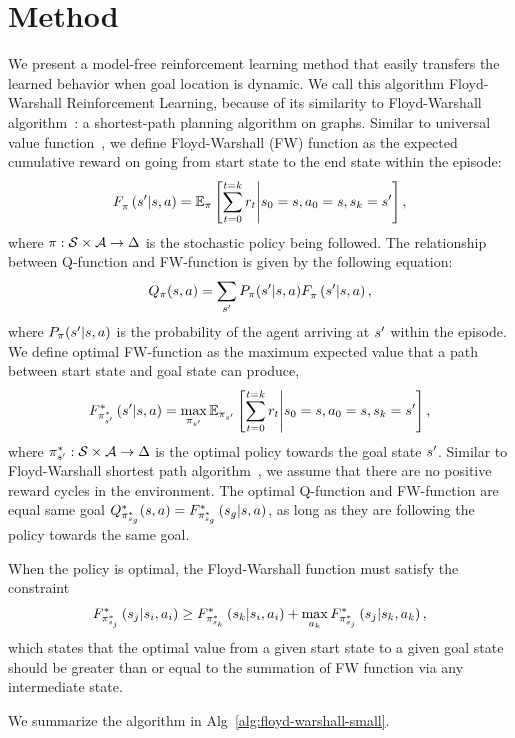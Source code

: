 \section{Method}
We present a model-free reinforcement learning method that easily transfers the
learned behavior when goal location is dynamic. We call this algorithm
Floyd-Warshall Reinforcement Learning, because of its similarity to
Floyd-Warshall algorithm~\cite{floydwarshall1962}:
a shortest-path planning algorithm on graphs. Similar
to universal value function~\cite{schaul2015universal}, we define Floyd-Warshall
(FW) function as the expected cumulative reward on going from start state to the
end state within the episode:
%
\begin{align}
\fwargs{\state}{\act}{\state'}{\policy}{} =
\E_{\policy}\left[ \sum_{t=0}^{t=k} \rew_t \middle\vert \state_0 = \state, \act_0 = \state, \state_k = \state' \right] ,
\end{align}%
%
where $\policy: \State \times \Action \rightarrow \Delta$ is the
stochastic policy being followed. The relationship between Q-function and
FW-function is given by the following equation:
\begin{align}
  \Q_\policy(\state, \act) = \sum_{\state'} P_\policy(\state' | \state, \act) \fwargs{\state}{\act}{\state'}{\policy}{},
\end{align}%
%
where $P_\policy(\state' | \state, \act)$ is the probability of the agent
arriving at $\state'$ within the episode. We define optimal FW-function as
the maximum expected value that a path between start state and goal state can
produce,
\begin{align}
\fwargs{\state}{\act}{\state'}{\policy^*_{\state'}}{*} =
\max_{\policy_{\state'}}\E_{\policy_{\state'}}\left[ \sum_{t=0}^{t=k} \rew_t \middle\vert \state_0 = \state, \act_0 = \state, \state_k = \state' \right] ,
\end{align}%
where $\policy^*_{\state'}: \State \times \Action \rightarrow \Delta$ is the
optimal policy towards the goal state $\state'$. Similar to Floyd-Warshall
shortest path algorithm~\cite{floydwarshall1962}, we assume that there are no
positive reward cycles in the environment.
The optimal Q-function and FW-function are equal same goal
  $\Q^*_{\policy^*_{\state_g}}(\state, \act) =
  \fwargs{\state}{\act}{\state_g}{\policy^*_{\state_g}}{*}$, as long as they are
  following the policy towards the same goal.

When the policy is optimal, the Floyd-Warshall function must satisfy the constraint
%
\begin{align}
\fwargs{\state_i}{\act_i}{\state_j}{\policy^*_{\state_j}}{*}
 \ge 
  \fwargs{\state_i}{\act_i}{\state_k}{\policy^*_{\state_k}}{*}
  + \max_{\act_k}\fwargs{\state_k}{\act_k}{\state_j}{\policy^*_{\state_j}}{*} ,
\end{align}%
%
which states that the optimal value from a given start state to a
given goal state should be greater than or equal to the summation of FW
function via any intermediate state. 

We summarize the algorithm in Alg~\ref{alg:floyd-warshall-small}.





